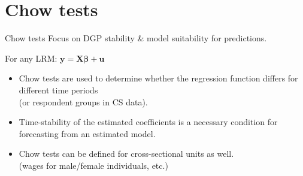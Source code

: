 \documentclass{beamer}
\begin{document}
\section{Chow tests}
\begin{frame}{Chow tests}
Focus on DGP stability \& model suitability for predictions.

\medskip
For any LRM: $\bm{y} = \bm{X\beta}+\bm{u}$
\vspace{0.3cm}
\begin{itemize}
\item Chow tests are used to determine whether the regression function differs for different time periods \\(or respondent groups in CS data). 
\item Time-stability of the estimated coefficients is a necessary condition for forecasting from an estimated model.
\item Chow tests can be defined for cross-sectional units as well. \\(wages for male/female individuals, etc.)
\end{itemize}

\end{frame}

\end{document}
